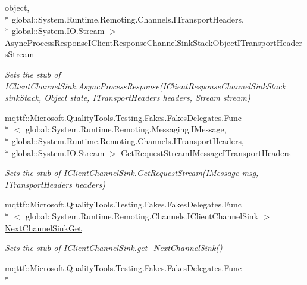 \begin{DoxyCompactItemize}
object, \\*
global\-::\-System.\-Runtime.\-Remoting.\-Channels.\-I\-Transport\-Headers, \\*
global\-::\-System.\-I\-O.\-Stream $>$ \hyperlink{class_system_1_1_runtime_1_1_remoting_1_1_channels_1_1_fakes_1_1_stub_i_client_formatter_sink_a69d71b4a8978d920bdb48851d23f4dc7}{Async\-Process\-Response\-I\-Client\-Response\-Channel\-Sink\-Stack\-Object\-I\-Transport\-Headers\-Stream}
\begin{DoxyCompactList}\small\item\em Sets the stub of I\-Client\-Channel\-Sink.\-Async\-Process\-Response(\-I\-Client\-Response\-Channel\-Sink\-Stack sink\-Stack, Object state, I\-Transport\-Headers headers, Stream stream)\end{DoxyCompactList}\item 
mqttf\-::\-Microsoft.\-Quality\-Tools.\-Testing.\-Fakes.\-Fakes\-Delegates.\-Func\\*
$<$ global\-::\-System.\-Runtime.\-Remoting.\-Messaging.\-I\-Message, \\*
global\-::\-System.\-Runtime.\-Remoting.\-Channels.\-I\-Transport\-Headers, \\*
global\-::\-System.\-I\-O.\-Stream $>$ \hyperlink{class_system_1_1_runtime_1_1_remoting_1_1_channels_1_1_fakes_1_1_stub_i_client_formatter_sink_ab737d21c00d845a16e97c41139356667}{Get\-Request\-Stream\-I\-Message\-I\-Transport\-Headers}
\begin{DoxyCompactList}\small\item\em Sets the stub of I\-Client\-Channel\-Sink.\-Get\-Request\-Stream(\-I\-Message msg, I\-Transport\-Headers headers)\end{DoxyCompactList}\item 
mqttf\-::\-Microsoft.\-Quality\-Tools.\-Testing.\-Fakes.\-Fakes\-Delegates.\-Func\\*
$<$ global\-::\-System.\-Runtime.\-Remoting.\-Channels.\-I\-Client\-Channel\-Sink $>$ \hyperlink{class_system_1_1_runtime_1_1_remoting_1_1_channels_1_1_fakes_1_1_stub_i_client_formatter_sink_a03a6e8ac5ca91c4153b9e2a17ca46248}{Next\-Channel\-Sink\-Get}
\begin{DoxyCompactList}\small\item\em Sets the stub of I\-Client\-Channel\-Sink.\-get\-\_\-\-Next\-Channel\-Sink()\end{DoxyCompactList}\item 
mqttf\-::\-Microsoft.\-Quality\-Tools.\-Testing.\-Fakes.\-Fakes\-Delegates.\-Func\\*

\end{DoxyCompactItemize}

